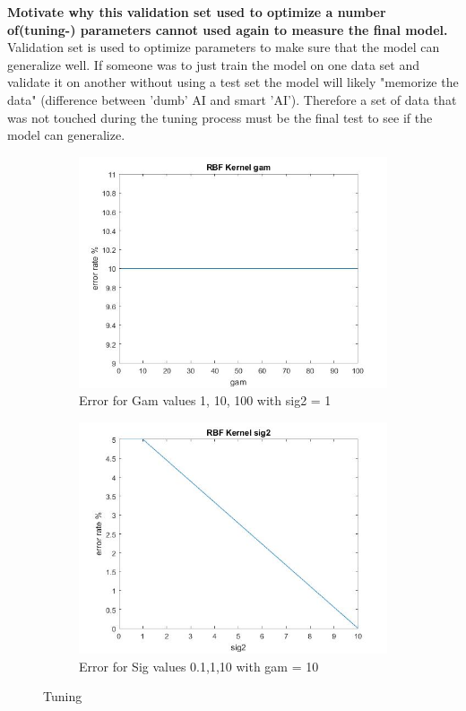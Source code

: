 \documentclass[11pt,oneside,a4paper]{article}
\begin{document}
\textbf{Motivate why this validation set used to optimize a number of(tuning-) parameters cannot used again to measure the final model.} \\

Validation set is used to optimize parameters to make sure that the model can generalize well. If someone was to just train the model on one data set and validate it on another without using a test set the model will likely "memorize the data" (difference between 'dumb' AI and smart 'AI'). Therefore a set of data that was not touched during the tuning process must be the final test to see if the model can generalize. 

\begin{figure}[H]
	\begin{subfigure}[b]{0.5\textwidth}
		\includegraphics[width=\textwidth]{../Figures/valerrorg}
		\caption{Error for Gam values 1, 10, 100 with sig2 = 1}
	\end{subfigure}
	\begin{subfigure}[b]{0.5\textwidth}
		\includegraphics[width=\textwidth]{../Figures/Valerror}
		\caption{Error for Sig values 0.1,1,10 with gam = 10}
	\end{subfigure}
	\caption{Tuning}
\end{figure}
\end{document}
